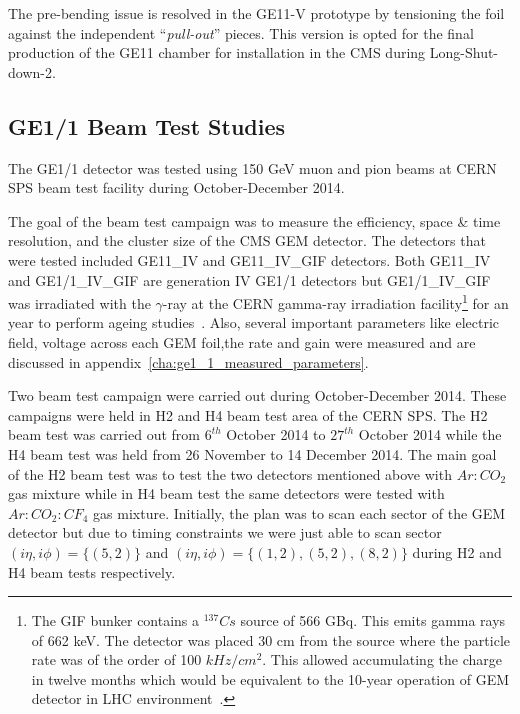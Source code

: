 The pre-bending issue is resolved in the GE11-V prototype by tensioning the foil against the independent ``\textit{pull-out}'' pieces. This version is opted for the final production of the GE11 chamber for installation in the CMS during Long-Shut-down-2.

\subsection{GE1/1 Beam Test Studies}
The GE1/1 detector was tested using 150 GeV muon and pion beams at CERN SPS beam test facility during October-December 2014. 

The goal of the beam test campaign was to measure the efficiency, space \& time resolution, and the cluster size of the CMS GEM detector. 
The detectors that were tested included GE11\_IV and GE11\_IV\_GIF detectors.
Both GE11\_IV and GE1/1\_IV\_GIF are generation IV GE1/1 detectors but GE1/1\_IV\_GIF was irradiated with the $\gamma$-ray at the CERN gamma-ray irradiation facility\footnote{The GIF bunker contains a $^{137}Cs$ source of 566 GBq. This emits gamma rays of 662 keV. The detector was placed 30 cm from the source where the particle rate was of the order of 100 $kHz/cm^2$. This allowed accumulating the charge in twelve months which would be equivalent to the 10-year operation of GEM detector in LHC environment~\cite{Merlin2013}.} for an year to perform ageing studies~\cite{Merlin2013}. Also, several important parameters like electric field, voltage across each GEM foil,the rate and gain were measured and are discussed in appendix~\ref{cha:ge1_1_measured_parameters}.

Two beam test campaign were carried out during October-December 2014.
These campaigns were held in H2 and H4 beam test area of the CERN SPS.
The H2 beam test was carried out from $6^{th}$ October 2014 to $27^{th}$ October 2014 while the H4 beam test was held from 26 November to 14 December 2014.
The main goal of the H2 beam test was to test the two detectors mentioned above with $Ar:CO_2$ gas mixture while in H4 beam test the same detectors were tested with $Ar:CO_2:CF_4$ gas mixture.
Initially, the plan was to scan each sector of the GEM detector but due to timing constraints we were just able to scan sector $(i\eta, i\phi)=\{(5,2)\}$ and $(i\eta,i\phi)=\{(1,2),(5,2),(8,2)\}$ during H2 and H4 beam tests respectively.  

